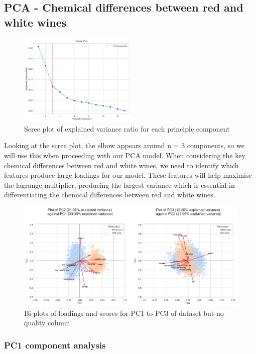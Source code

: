 \documentclass[
]{article}
\begin{document}
\subsection{PCA - Chemical differences between red and white
wines}\label{pca---chemical-differences-between-red-and-white-wines}

\begin{figure}
\centering
\includegraphics[width=0.5\textwidth,height=\textheight]{Scree_plot.png}
\caption{Scree plot of explained variance ratio for each principle
component}
\end{figure}

Looking at the scree plot, the elbow appears around n = 3 components, so
we will use this when proceeding with our PCA model. When considering
the key chemical differences between red and white wines, we need to
identify which features produce large loadings for our model. These
features will help maximise the lagrange multiplier, producing the
largest variance which is essential in differentiating the chemical
differences between red and white wines.

\begin{figure}
\centering
\includegraphics{biplots_combined_no_quality_new.png}
\caption{Bi-plots of loadings and scores for PC1 to PC3 of dataset but
no quality column}
\end{figure}

\subsubsection{PC1 component analysis}\label{pc1-component-analysis}
\end{document}
